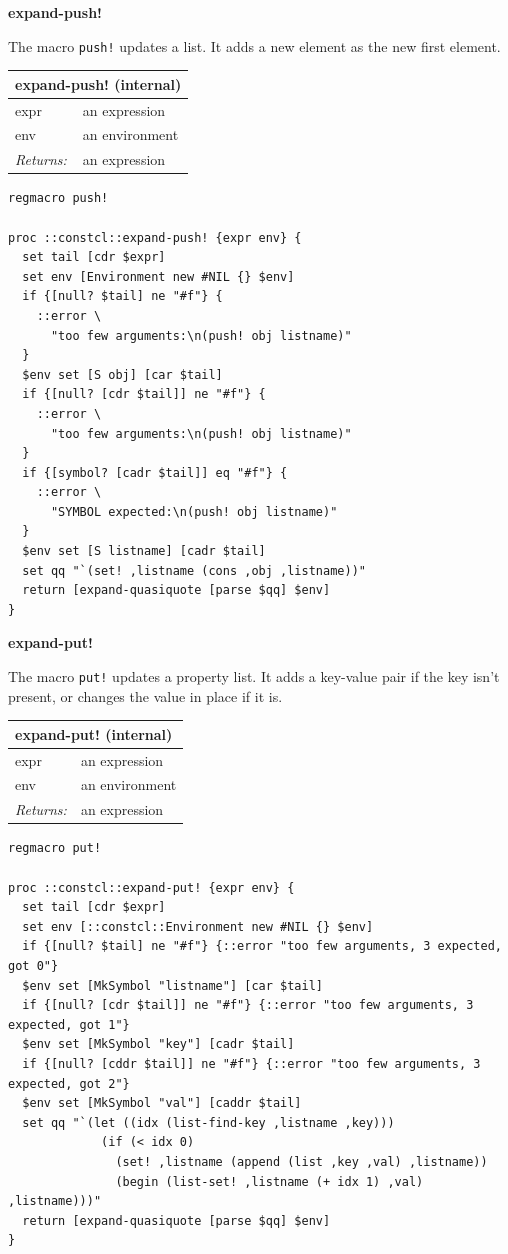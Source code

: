 \documentclass[twoside,9pt]{report}
\begin{document}
\textbf{expand-push!}


The macro \texttt{push!} updates a list. It adds a new element as the new first element.

\begin{tabular}{ |l l| }
\hline
\multicolumn{2}{|l|}{expand-push! (internal)} \\
\hline
expr & an expression \\
env & an environment \\
\textit{Returns:} & an expression \\
\hline
\end{tabular}

\noindent\makebox[\linewidth]{\rule{\linewidth}{0.4pt}}
\begin{lstlisting}
regmacro push!
 
proc ::constcl::expand-push! {expr env} {
  set tail [cdr $expr]
  set env [Environment new #NIL {} $env]
  if {[null? $tail] ne "#f"} {
    ::error \
      "too few arguments:\n(push! obj listname)"
  }
  $env set [S obj] [car $tail]
  if {[null? [cdr $tail]] ne "#f"} {
    ::error \
      "too few arguments:\n(push! obj listname)"
  }
  if {[symbol? [cadr $tail]] eq "#f"} {
    ::error \
      "SYMBOL expected:\n(push! obj listname)"
  }
  $env set [S listname] [cadr $tail]
  set qq "`(set! ,listname (cons ,obj ,listname))"
  return [expand-quasiquote [parse $qq] $env]
}
\end{lstlisting}
\noindent\makebox[\linewidth]{\rule{\linewidth}{0.4pt}}

\textbf{expand-put!}


The macro \texttt{put!} updates a property list. It adds a key-value pair if the key isn't present, or changes the value in place if it is.

\begin{tabular}{ |l l| }
\hline
\multicolumn{2}{|l|}{expand-put! (internal)} \\
\hline
expr & an expression \\
env & an environment \\
\textit{Returns:} & an expression \\
\hline
\end{tabular}

\noindent\makebox[\linewidth]{\rule{\linewidth}{0.4pt}}
\begin{lstlisting}
regmacro put!
 
proc ::constcl::expand-put! {expr env} {
  set tail [cdr $expr]
  set env [::constcl::Environment new #NIL {} $env]
  if {[null? $tail] ne "#f"} {::error "too few arguments, 3 expected, got 0"}
  $env set [MkSymbol "listname"] [car $tail]
  if {[null? [cdr $tail]] ne "#f"} {::error "too few arguments, 3 expected, got 1"}
  $env set [MkSymbol "key"] [cadr $tail]
  if {[null? [cddr $tail]] ne "#f"} {::error "too few arguments, 3 expected, got 2"}
  $env set [MkSymbol "val"] [caddr $tail]
  set qq "`(let ((idx (list-find-key ,listname ,key)))
             (if (< idx 0)
               (set! ,listname (append (list ,key ,val) ,listname))
               (begin (list-set! ,listname (+ idx 1) ,val) ,listname)))"
  return [expand-quasiquote [parse $qq] $env]
}
\end{lstlisting}
\noindent\makebox[\linewidth]{\rule{\linewidth}{0.4pt}}
\end{document}
